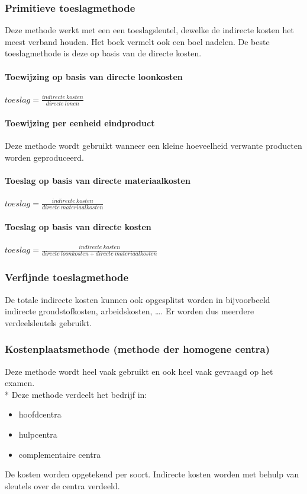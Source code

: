 \documentclass[12pt]{article}
\begin{document}
\subsubsection{Primitieve toeslagmethode}
Deze methode werkt met een een toeslagsleutel, dewelke de indirecte kosten het meest verband houden. Het boek vermelt ook een boel nadelen. De beste toeslagmethode is deze op basis van de directe kosten.
\paragraph{Toewijzing op basis van directe loonkosten}
$toeslag = \frac{indirecte\ kosten}{directe\ lonen}$
\paragraph{Toewijzing per eenheid eindproduct}
Deze methode wordt gebruikt wanneer een kleine hoeveelheid verwante producten worden geproduceerd.
\paragraph{Toeslag op basis van directe materiaalkosten}
$toeslag = \frac{indirecte\ kosten}{directe\ materiaalkosten}$
\paragraph{Toeslag op basis van directe kosten}
$toeslag = \frac{indirecte\ kosten}{directe\ loonkosten + directe\ materiaalkosten}$
\subsubsection{Verfijnde toeslagmethode}
De totale indirecte kosten kunnen ook opgesplitst worden in bijvoorbeeld indirecte grondstofkosten, arbeidskosten, \dots. Er worden dus meerdere verdeelsleutels gebruikt.
\subsubsection{Kostenplaatsmethode (methode der homogene centra)}
Deze methode wordt heel vaak gebruikt en ook heel vaak gevraagd op het examen.\\*
Deze methode verdeelt het bedrijf in:
\begin{itemize}
\item hoofdcentra
\item hulpcentra
\item complementaire centra
\end{itemize}
De kosten worden opgetekend per soort. Indirecte kosten worden met behulp van sleutels over de centra verdeeld.
\end{document}
